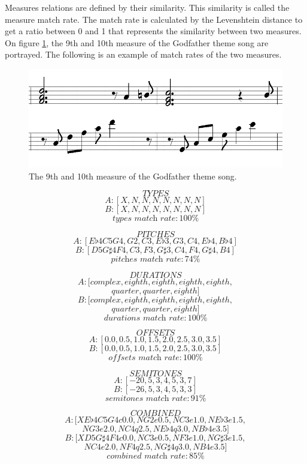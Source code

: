 Measures relations are defined by their similarity. This similarity is called the measure match rate. The match rate is calculated by the Levenshtein distance \cite{Levenshtein} to get a ratio between 0 and 1 that represents the similarity between two measures.
On figure \ref{fig:GF_measures}, the 9th and 10th measure of the Godfather theme song are portrayed. The following is an example of match rates of the two measures.
\begin{figure}[H]
	\includegraphics[width=\linewidth]{Fotos/measures/GF_9-10.png}
	\caption{The 9th and 10th measure of the Godfather theme song.}
	\label{fig:GF_measures}
\end{figure}
\[\textit{TYPES}\]
\[A: [X, N, N, N, N, N, N, N] \]
\[B: [X, N, N, N, N, N, N, N] \]
\[\textit{types match rate}: 100\% \]

\[\textit{PITCHES}\]
\[A: [E\flat4C5G4, G2, C3, E\flat3, G3, C4, E\flat4, B\flat4] \]
\[B: [D5G\sharp4F4, C3, F3, G\sharp3, C4, F4, G\sharp4, B4] \]
\[\textit{pitches match rate}: 74\% \]

\[\textit{DURATIONS}\]
\[A: [complex, eighth, eighth, eighth, eighth, \]
\[quarter, quarter, eighth] \]
\[B: [complex, eighth, eighth, eighth, eighth, \]
\[quarter, quarter, eighth]\]
\[\textit{durations match rate}: 100\% \]

\[\textit{OFFSETS}\]
\[A: [0.0, 0.5, 1.0, 1.5, 2.0, 2.5, 3.0, 3.5]\]
\[ B: [0.0, 0.5, 1.0, 1.5, 2.0, 2.5, 3.0, 3.5] \]
\[\textit{offsets match rate}: 100\% \]

\[\textit{SEMITONES}\]
\[ A: [-20, 5, 3, 4, 5, 3, 7] \]
\[ B: [-26, 5, 3, 4, 5, 3, 3]\]
\[\textit{semitones match rate}: 91\% \]

\[\textit{COMBINED}\]
\[ A: [XE\flat4C5G4c0.0, NG2e0.5, NC3e1.0, NE\flat3e1.5, \]
\[NG3e2.0, NC4q2.5, NE\flat4q3.0, NB\flat4e3.5]\]
\[ B: [XD5G\sharp4F4c0.0, NC3e0.5, NF3e1.0, NG\sharp3e1.5,\]
\[NC4e2.0, NF4q2.5, NG\sharp4q3.0, NB4e3.5]\]
\[\textit{combined match rate}: 85\% \]